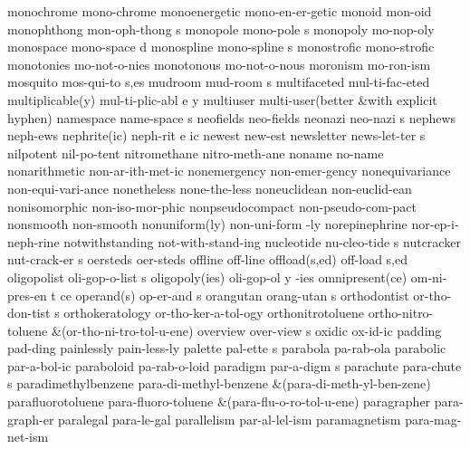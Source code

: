 \1 monochrome		mono-chrome
\1 monoenergetic	mono-en-er-getic
\1 monoid		mon-oid
\NewWordtrue
\5 monophthong		mon-oph-thong s		%
\5 monopole		mono-pole s
\1 monopoly		mo-nop-oly
\NewWordtrue
\5 monospace		mono-space d		%
\5 monospline		mono-spline s
\1 monostrofic		mono-strofic
\1 monotonies		mo-not-o-nies
\1 monotonous		mo-not-o-nous
\1 moronism		mo-ron-ism
\5 mosquito		mos-qui-to s,es
\5 mudroom		mud-room s
\1 multifaceted 	mul-ti-fac-eted
\3 multiplicable(y)	mul-ti-plic-abl e y
\1 multiuser		multi-user\quad (better
\tabalign		&\null\quad with explicit hyphen)\cr
\NewWordtrue
\5 namespace		name-space s		%
\1 neofields		neo-fields
\5 neonazi		neo-nazi s
\1 nephews		neph-ews		%
\3 nephrite(ic)		neph-rit e ic		%
\1 newest		new-est 		%
\5 newsletter		news-let-ter s
\1 nilpotent            nil-po-tent             %
\1 nitromethane		nitro-meth-ane		%
\1 noname		no-name
\1 nonarithmetic	non-ar-ith-met-ic	%
\1 nonemergency 	non-emer-gency
\1 nonequivariance	non-equi-vari-ance
\1 nonetheless		none-the-less        %
\1 noneuclidean 	non-euclid-ean
\1 nonisomorphic	non-iso-mor-phic
\1 nonpseudocompact	non-pseudo-com-pact
\1 nonsmooth		non-smooth
\2 nonuniform(ly)	non-uni-form -ly
\1 norepinephrine	nor-ep-i-neph-rine
\1 notwithstanding	not-with-stand-ing   %
\5 nucleotide		nu-cleo-tide s		%
\5 nutcracker		nut-crack-er s
\1 oersteds		oer-steds
\1 offline		off-line		%
\2 offload(s,ed)	off-load s,ed		%
\5 oligopolist		oli-gop-o-list s
\3 oligopoly(ies)	oli-gop-ol y -ies
\NewWordtrue
\3 omnipresent(ce)	om-ni-pres-en t ce	%
\2 operand(s)		op-er-and s
\5 orangutan		orang-utan s
\5 orthodontist 	or-tho-don-tist s
\1 orthokeratology	or-tho-ker-a-tol-ogy
\1 orthonitrotoluene	ortho-nitro-toluene
\tabalign		&\null\quad (or-tho-ni-tro-tol-u-ene)\cr
\5 overview		over-view s
\1 oxidic		ox-id-ic
\1 padding		pad-ding
\1 painlessly		pain-less-ly
\5 palette		pal-ette s		%
\1 parabola		pa-rab-ola
\1 parabolic		par-a-bol-ic
\1 paraboloid		pa-rab-o-loid
\5 paradigm		par-a-digm s
\5 parachute		para-chute s
\1 paradimethylbenzene	para-di-methyl-benzene
\tabalign		&\null\quad (para-di-meth-yl-ben-zene)\cr
\1 parafluorotoluene	para-fluoro-toluene
\tabalign		&\null\quad (para-flu-o-ro-tol-u-ene)\cr
\1 paragrapher		para-graph-er
\1 paralegal		para-le-gal
\1 parallelism		par-al-lel-ism
\1 paramagnetism	para-mag-net-ism
